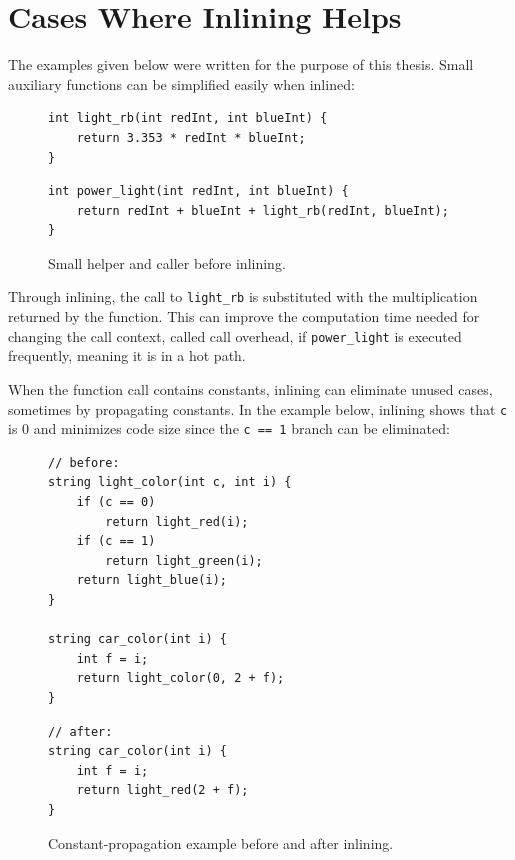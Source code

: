 \documentclass[12pt, a4paper]{report}
\begin{document}
\section{Cases Where Inlining Helps}

The examples given below were written for the purpose of this thesis. Small
auxiliary functions can be simplified easily when inlined:

\begin{figure}[H]
\centering
\begin{minipage}[t]{0.72\textwidth}
\begin{verbatim}
int light_rb(int redInt, int blueInt) {
    return 3.353 * redInt * blueInt;
}
\end{verbatim}
\end{minipage}
\vspace{0.35em}

\begin{minipage}[t]{0.72\textwidth}
\begin{verbatim}
int power_light(int redInt, int blueInt) {
    return redInt + blueInt + light_rb(redInt, blueInt);
}
\end{verbatim}
\end{minipage}
\caption{Small helper and caller before inlining.}
\label{fig:ab-sum-ab-example}
\end{figure}

Through inlining, the call to \texttt{light\_rb} is substituted with the
multiplication returned by the function. This can improve the computation time
needed for changing the call context, called call overhead, if
\texttt{power\_light} is executed frequently, meaning it is in a hot path.

When the function call contains constants, inlining can eliminate unused cases,
sometimes by propagating constants. In the example below, inlining shows that
\texttt{c} is 0 and minimizes code size since the \texttt{c == 1} branch can be
eliminated:

\begin{figure}[H]
\centering
\begin{minipage}[t]{0.49\textwidth}
\begin{verbatim}
// before:
string light_color(int c, int i) {
    if (c == 0)
        return light_red(i);
    if (c == 1)
        return light_green(i);
    return light_blue(i);
}

string car_color(int i) {
    int f = i;
    return light_color(0, 2 + f);
}
\end{verbatim}
\end{minipage}\hfill
\begin{minipage}[t]{0.47\textwidth}
\begin{verbatim}
// after:
string car_color(int i) {
    int f = i;
    return light_red(2 + f);
}
\end{verbatim}
\end{minipage}
\caption{Constant-propagation example before and after inlining.}
\label{fig:inline-constant-example}
\end{figure}
\end{document}
